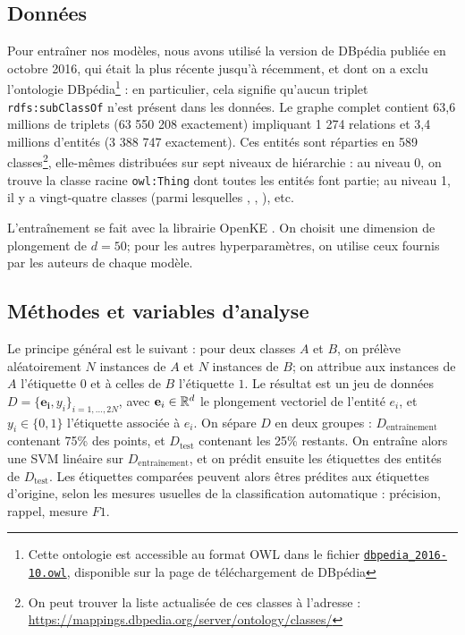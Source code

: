 \subsection{Données}
\label{subsec:kge-data-dbpedia}
Pour entraîner nos modèles, nous avons utilisé la version de DBpédia publiée en octobre 2016, qui était la plus récente jusqu'à récemment, et dont on a exclu l'ontologie DBpédia\footnote{Cette ontologie est accessible au format OWL dans le fichier \texttt{\href{http://downloads.dbpedia.org/2016-10/dbpedia\_2016-10.owl}{dbpedia\_2016-10.owl}}, disponible sur la page de téléchargement de DBpédia} : en particulier, cela signifie qu'aucun triplet \texttt{rdfs:subClassOf} n'est présent dans les données. Le graphe complet contient 63,6 millions de triplets (63 550 208 exactement) impliquant 1 274 relations et 3,4 millions d'entités (3 388 747 exactement). Ces entités sont réparties en 589 classes\footnote{On peut trouver la liste actualisée de ces classes à l'adresse : \href{mappings.dbpedia.org/server/ontology/classes/}{https://mappings.dbpedia.org/server/ontology/classes/}}, elle-mêmes distribuées sur sept niveaux de hiérarchie : au niveau 0, on trouve la classe racine \texttt{owl:Thing} dont toutes les entités font partie; au niveau 1, il y a vingt-quatre classes (parmi lesquelles , , ), etc. 

L'entraînement se fait avec la librairie OpenKE \cite{openke}. On choisit une dimension de plongement de $d=50$; pour les autres hyperparamètres, on utilise ceux fournis par les auteurs de chaque modèle.

\subsection{Méthodes et variables d'analyse}
\label{subsec:kge-sep-method}

Le principe général est le suivant : pour deux classes $A$ et $B$, on prélève aléatoirement $N$ instances de $A$ et $N$ instances de $B$; on attribue aux instances de $A$ l'étiquette $0$ et à celles de $B$ l'étiquette $1$. Le résultat est un jeu de données $D = \{\mathbf{e_i}, y_i \}_{i=1, \ldots, 2N}$, avec $\mathbf{e}_i \in \mathbb{R}^d$ le plongement vectoriel de l'entité $e_i$, et $y_i \in \{ 0, 1\}$ l'étiquette associée à $e_i$. 
On sépare $D$ en deux groupes : $D_\textrm{entraînement}$ contenant 75\% des points, et $D_\textrm{test}$ contenant les 25\% restants. On entraîne alors une SVM linéaire sur $D_\textrm{entraînement}$, et on prédit ensuite les étiquettes des entités de $D_\textrm{test}$.
Les étiquettes comparées peuvent alors êtres prédites aux étiquettes d'origine, selon les mesures usuelles de la classification automatique : précision, rappel, mesure $F1$. 

